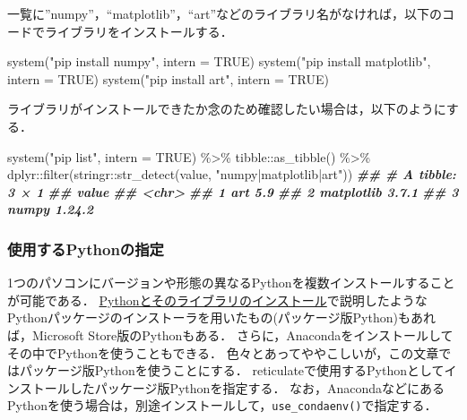 \documentclass[
]{article}
\newenvironment{Shaded}{\begin{snugshade}}{\end{snugshade}}
\newcommand{\AttributeTok}[1]{\textcolor[rgb]{0.77,0.63,0.00}{#1}}
\newcommand{\ConstantTok}[1]{\textcolor[rgb]{0.00,0.00,0.00}{#1}}
\newcommand{\DocumentationTok}[1]{\textcolor[rgb]{0.56,0.35,0.01}{\textbf{\textit{#1}}}}
\newcommand{\FunctionTok}[1]{\textcolor[rgb]{0.00,0.00,0.00}{#1}}
\newcommand{\NormalTok}[1]{#1}
\newcommand{\SpecialCharTok}[1]{\textcolor[rgb]{0.00,0.00,0.00}{#1}}
\newcommand{\StringTok}[1]{\textcolor[rgb]{0.31,0.60,0.02}{#1}}
\begin{document}
一覧に''numpy''，``matplotlib''，``art''などのライブラリ名がなければ，以下のコードでライブラリをインストールする．

\begin{Shaded}
\begin{Highlighting}[]
\FunctionTok{system}\NormalTok{(}\StringTok{"pip install numpy"}\NormalTok{, }\AttributeTok{intern =} \ConstantTok{TRUE}\NormalTok{)}
\FunctionTok{system}\NormalTok{(}\StringTok{"pip install matplotlib"}\NormalTok{, }\AttributeTok{intern =} \ConstantTok{TRUE}\NormalTok{)}
\FunctionTok{system}\NormalTok{(}\StringTok{"pip install art"}\NormalTok{, }\AttributeTok{intern =} \ConstantTok{TRUE}\NormalTok{)}
\end{Highlighting}
\end{Shaded}

ライブラリがインストールできたか念のため確認したい場合は，以下のようにする．

\begin{Shaded}
\begin{Highlighting}[]
\FunctionTok{system}\NormalTok{(}\StringTok{"pip list"}\NormalTok{, }\AttributeTok{intern =} \ConstantTok{TRUE}\NormalTok{) }\SpecialCharTok{\%\textgreater{}\%}
\NormalTok{  tibble}\SpecialCharTok{::}\FunctionTok{as\_tibble}\NormalTok{() }\SpecialCharTok{\%\textgreater{}\%}
\NormalTok{  dplyr}\SpecialCharTok{::}\FunctionTok{filter}\NormalTok{(stringr}\SpecialCharTok{::}\FunctionTok{str\_detect}\NormalTok{(value, }\StringTok{"numpy|matplotlib|art"}\NormalTok{))}
\DocumentationTok{\#\# \# A tibble: 3 × 1}
\DocumentationTok{\#\#   value                 }
\DocumentationTok{\#\#   \textless{}chr\textgreater{}                 }
\DocumentationTok{\#\# 1 art             5.9   }
\DocumentationTok{\#\# 2 matplotlib      3.7.1 }
\DocumentationTok{\#\# 3 numpy           1.24.2}
\end{Highlighting}
\end{Shaded}

\hypertarget{identify_python}{%
\subsubsection{使用するPythonの指定}\label{identify_python}}

1つのパソコンにバージョンや形態の異なるPythonを複数インストールすることが可能である．
\protect\hyperlink{install_python}{Pythonとそのライブラリのインストール}で説明したようなPythonパッケージのインストーラを用いたもの(パッケージ版Python)もあれば，Microsoft Store版のPythonもある．
さらに，Anacondaをインストールしてその中でPythonを使うこともできる．
色々とあってややこしいが，この文章ではパッケージ版Pythonを使うことにする．
reticulateで使用するPythonとしてインストールしたパッケージ版Pythonを指定する．
なお，AnacondaなどにあるPythonを使う場合は，別途インストールして，\texttt{use\_condaenv()}で指定する．
\end{document}
